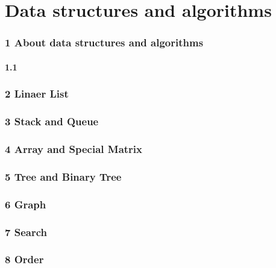 \part*{Data structures and algorithms}

\section*{1 About data structures and algorithms}

\subsection*{1.1 }

\newpage

\section*{2  Linaer List}

\newpage

\section*{3 Stack and Queue}

\newpage

\section*{4 Array and Special Matrix}

\newpage

\section*{5 Tree and Binary Tree}

\newpage

\section*{6 Graph}

\newpage

\section*{7 Search}

\newpage

\section*{8 Order}
